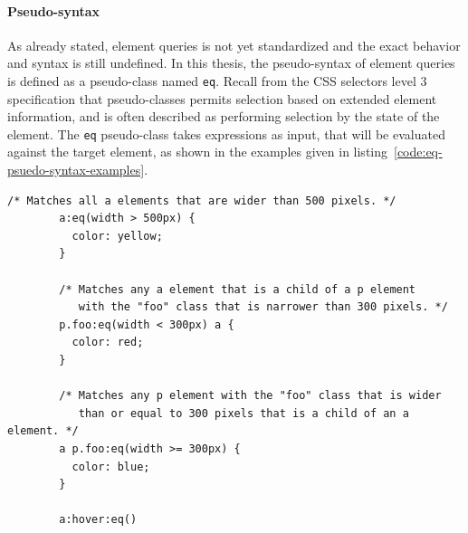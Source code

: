 \documentclass[a4paper,11pt]{kth-mag}
\newcommand{\code}[1]{\texttt{#1}}
\begin{document}
      \paragraph{Pseudo-syntax}
      As already stated, element queries is not yet standardized and the exact behavior and syntax is still undefined.
      In this thesis, the pseudo-syntax of element queries is defined as a pseudo-class named \code{eq}.
      Recall from the \gls{CSS} selectors level 3 specification \cite{w3c_css_selectors} that pseudo-classes permits selection based on extended element information, and is often described as performing selection by the state of the element.
      The \code{eq} pseudo-class takes expressions as input, that will be evaluated against the target element, as shown in the examples given in listing~\ref{code:eq-psuedo-syntax-examples}.
      \begin{lstlisting}[gobble=8,caption={Examples of the psuedo element queries syntax.}, captionpos=b, label={code:eq-psuedo-syntax-examples}]
        /* Matches all a elements that are wider than 500 pixels. */
        a:eq(width > 500px) {
          color: yellow;
        }

        /* Matches any a element that is a child of a p element 
           with the "foo" class that is narrower than 300 pixels. */
        p.foo:eq(width < 300px) a {
          color: red;
        }

        /* Matches any p element with the "foo" class that is wider 
           than or equal to 300 pixels that is a child of an a element. */
        a p.foo:eq(width >= 300px) {
          color: blue;
        }

        a:hover:eq()
      \end{lstlisting}


\end{document}
